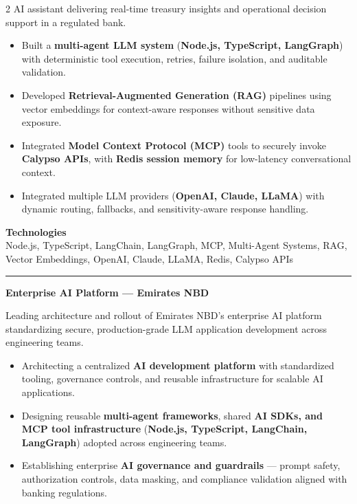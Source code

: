 \documentclass[10pt,a4paper]{article}
\newcommand{\blockdivider}{\vspace{0pt}\color{rulecolor}\rule{\linewidth}{0.5pt}\color{primary}\vspace{4pt}}
\newcommand{\projecttitle}[1]{\textbf{#1}\par\vspace{2pt}}
\begin{document}
\begin{paracol}{2}
AI assistant delivering real-time treasury insights and operational decision support in a regulated bank.

\begin{itemize}

\item Built a \textbf{multi-agent LLM system} (\textbf{Node.js, TypeScript, LangGraph}) with deterministic tool execution, retries, failure isolation, and auditable validation.

\item Developed \textbf{Retrieval-Augmented Generation (RAG)} pipelines using vector embeddings for context-aware responses without sensitive data exposure.

\item Integrated \textbf{Model Context Protocol (MCP)} tools to securely invoke \textbf{Calypso APIs}, with \textbf{Redis session memory} for low-latency conversational context.

\item Integrated multiple LLM providers (\textbf{OpenAI, Claude, LLaMA}) with dynamic routing, fallbacks, and sensitivity-aware response handling.

\end{itemize}

\textbf{Technologies}\\
Node.js, TypeScript, LangChain, LangGraph, MCP, Multi-Agent Systems, RAG, Vector Embeddings, OpenAI, Claude, LLaMA, Redis, Calypso APIs

\blockdivider

\projecttitle{Enterprise AI Platform — Emirates NBD}

Leading architecture and rollout of Emirates NBD's enterprise AI platform standardizing secure, production-grade LLM application development across engineering teams.

\begin{itemize}

\item Architecting a centralized \textbf{AI development platform} with standardized tooling, governance controls, and reusable infrastructure for scalable AI applications.

\item Designing reusable \textbf{multi-agent frameworks}, shared \textbf{AI SDKs, and MCP tool infrastructure} (\textbf{Node.js, TypeScript, LangChain, LangGraph}) adopted across engineering teams.

\item Establishing enterprise \textbf{AI governance and guardrails} — prompt safety, authorization controls, data masking, and compliance validation aligned with banking regulations.


\end{itemize}
\end{paracol}
\end{document}

